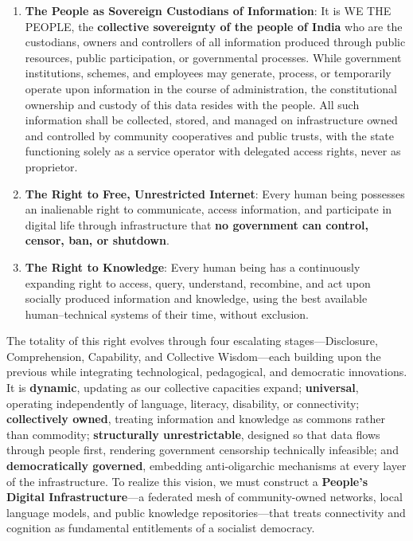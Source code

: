 \begin{enumerate}
\def\labelenumi{\arabic{enumi}.}
\item
  \textbf{The People as Sovereign Custodians of Information}: It is WE
  THE PEOPLE, the \textbf{collective sovereignty of the people of India}
  who are the custodians, owners and controllers of all information
  produced through public resources, public participation, or
  governmental processes. While government institutions, schemes, and
  employees may generate, process, or temporarily operate upon
  information in the course of administration, the constitutional
  ownership and custody of this data resides with the people. All such
  information shall be collected, stored, and managed on infrastructure
  owned and controlled by community cooperatives and public trusts, with
  the state functioning solely as a service operator with delegated
  access rights, never as proprietor.
\item
  \textbf{The Right to Free, Unrestricted Internet}: Every human being
  possesses an inalienable right to communicate, access information, and
  participate in digital life through infrastructure that \textbf{no
  government can control, censor, ban, or shutdown}.
\item
  \textbf{The Right to Knowledge}: Every human being has a continuously
  expanding right to access, query, understand, recombine, and act upon
  socially produced information and knowledge, using the best available
  human--technical systems of their time, without exclusion.
\end{enumerate}

The totality of this right evolves through four escalating
stages---Disclosure, Comprehension, Capability, and Collective
Wisdom---each building upon the previous while integrating
technological, pedagogical, and democratic innovations. It is
\textbf{dynamic}, updating as our collective capacities expand;
\textbf{universal}, operating independently of language, literacy,
disability, or connectivity; \textbf{collectively owned}, treating
information and knowledge as commons rather than commodity;
\textbf{structurally unrestrictable}, designed so that data flows
through people first, rendering government censorship technically
infeasible; and \textbf{democratically governed}, embedding
anti-oligarchic mechanisms at every layer of the infrastructure. To
realize this vision, we must construct a \textbf{People's Digital
Infrastructure}---a federated mesh of community-owned networks, local
language models, and public knowledge repositories---that treats
connectivity and cognition as fundamental entitlements of a socialist
democracy.

